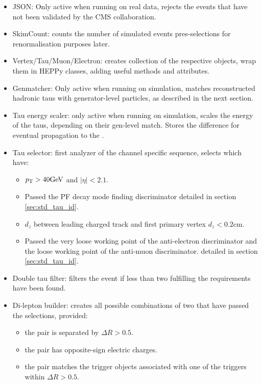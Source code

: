 \begin{itemize}
    \item JSON: Only active when running on real data, rejects the events that have not been validated by the CMS collaboration.
    \item SkimCount: counts the number of simulated events pres-selections for renormalisation purposes later.
    \item Vertex/Tau/Muon/Electron: creates collection of the respective objects, wrap them in HEPPy classes, adding useful methods and attributes.
    \item Genmatcher: Only active when running on simulation, matches reconstructed hadronic taus with generator-level particles, as described in the next section.
    \item Tau energy scaler: only active when running on simulation, scales the energy of the taus, depending on their gen-level match. Stores the difference for eventual propagation to the \MET.
    \item Tau selector: first analyzer of the channel specific sequence, selects \tauh which have:
    \begin{itemize}
    \item $p_{\mathrm{T}} > 40 \mathrm{GeV}$ and $|\eta| < 2.1$.
    \item Passed the PF decay mode finding discriminator detailed in section \ref{sec:std_tau_id}.
    \item $d_z$ between leading charged track and first primary vertex $d_z < 0.2 \mathrm{cm}$.
    \item Passed the very loose working point of the anti-electron discriminator and the loose working point of the anti-muon discriminator. detailed in section \ref{sec:std_tau_id}.
    \end{itemize}
    \item Double tau filter: filters the event if less than two \tauh fulfilling the requirements have been found.
    \item Di-lepton builder: creates all possible combinations of two \tauh that have passed the selections, provided:
    \begin{itemize}
    \item the pair is separated by $\Delta R > 0.5$.
    \item the pair has opposite-sign electric charges.
    \item the pair matches the trigger objects associated with one of the triggers within $\Delta R > 0.5$.
    \end{itemize}

\end{itemize}
